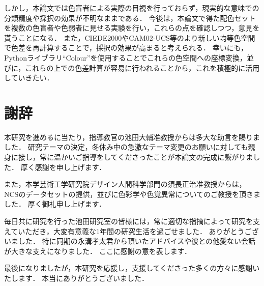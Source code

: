 \documentclass[uplatex,paper=a4,fontsize=4.0truemm,jafontsize=4.0truemm,head_space=30.0truemm,foot_space=30.0truemm,baselineskip=8.0truemm,line_length=40zw,gutter=25.0truemm,oneside,openany,fleqn,hanging_panctuation,open_bracket_pos=nibu_tentsuki,dvipdfmx,jis2004,book,titlepage]{jlreq}
\theoremstyle{mystyle}
\begin{document}
		しかし，本論文では色盲者による実際の目視を行っておらず，現実的な意味での分類精度や採択の効果が不明なままである．
		今後は，本論文で得た配色セットを複数の色盲者や色弱者に見せる実験を行い，これらの点を確認しつつ，意見を貰うことになる．
		また，CIEDE2000やCAM02-UCS等のより新しい均等色空間で色差を再計算することで，採択の効果が高まると考えられる．
		幸いにも，Pythonライブラリ``Colour''を使用することでこれらの色空間への座標変換，並びに，これらの上での色差計算が容易に行われることから，これを積極的に活用していきたい．
	\chapter*{謝辞}
		本研究を進めるに当たり，指導教官の池田大輔准教授からは多大な助言を賜りました．
		研究テーマの決定，冬休み中の急激なテーマ変更のお願いに対しても親身に接し，常に温かいご指導をしてくださったことが本論文の完成に繫がりました．
		厚く感謝を申し上げます．

		また，本学芸術工学研究院デザイン人間科学部門の須長正治准教授からは，NCSのデータセットの提供，並びに色彩学や色覚異常についてのご教授を頂きました．
		厚く御礼申し上げます．

		毎日共に研究を行った池田研究室の皆様には，常に適切な指摘によって研究を支えていただき，大変有意義な1年間の研究生活を過ごせました．
		ありがとうございました．
		特に同期の永溝孝太君から頂いたアドバイスや彼との他愛ない会話が大きな支えになりました．
		ここに感謝の意を表します．

		最後になりましたが，本研究を応援し，支援してくださった多くの方々に感謝いたします．
		本当にありがとうございました．
	\clearpage
	
	
\end{document}

